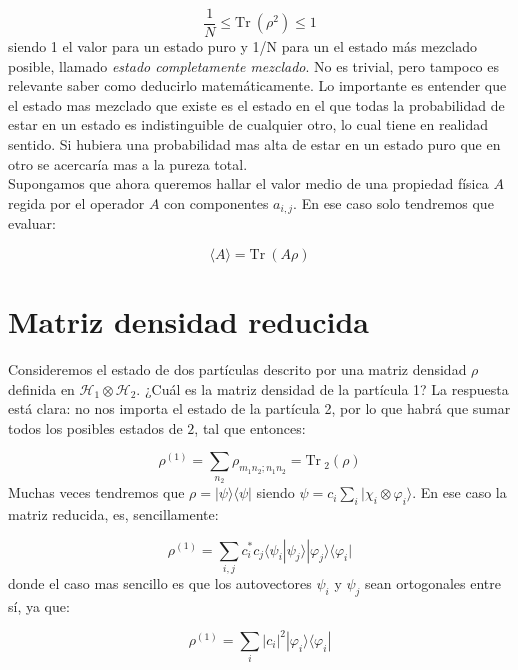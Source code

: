 \documentclass[12pt,a4paper]{book}
\numberwithin{equation}{chapter}
\numberwithin{figure}{chapter}
\newcommand{\Tr}{\mathrm{Tr} \ }
\newcommand{\Hcal}{\mathcal{H}}
\begin{document}
\begin{equation}
\frac{1}{N} \leq \Tr (\rho^2) \leq 1
\end{equation}
siendo 1 el valor para un estado puro y 1/N para un el estado más mezclado posible, llamado \textit{estado completamente mezclado}. No es trivial, pero tampoco es relevante saber como deducirlo matemáticamente. Lo importante es entender que el estado mas mezclado que existe es el estado en el que todas la probabilidad de estar en un estado es indistinguible de cualquier otro, lo cual tiene en realidad sentido. Si hubiera una probabilidad mas alta de estar en un estado puro que en otro se acercaría mas a la pureza total. \\

Supongamos que ahora queremos hallar el valor medio de una propiedad física $A$ regida por el operador $A$ con componentes $a_{i,j}$. En ese caso solo tendremos que evaluar:

\begin{equation}
\langle A \rangle = \Tr (A \rho)
\end{equation}

\section{Matriz densidad reducida}

Consideremos el estado de dos partículas descrito por una matriz densidad $\rho$ definida en $\Hcal_1 \otimes \Hcal_2$. ¿Cuál es la matriz densidad de la partícula 1? La respuesta está clara: no nos importa el estado de la partícula 2, por lo que habrá que sumar todos los posibles estados de $2$, tal que entonces:

\begin{equation}
\rho^{(1)}  = \sum_{n_2} \rho_{m_1 n_2; n_1 n_2}  = \Tr_2 (\rho)
\end{equation}
Muchas veces tendremos que $\rho = |\psi \rangle \langle \psi |$ siendo $\psi = c_i \sum_i |\chi_i \otimes \varphi_i \rangle$. En ese caso la matriz reducida, es, sencillamente:

\begin{equation}
\rho^{(1)} = \sum_{i,j} c_i^* c_j \langle \psi_i | \psi_j \rangle | \varphi_j \rangle \langle \varphi_i |
\end{equation}
donde el caso mas sencillo es que los autovectores $\psi_i$ y $\psi_j$ sean ortogonales entre sí, ya que:

\begin{equation}
\rho^{(1)} = \sum_i |c_i|^2 |\varphi_i \rangle \langle \varphi_i |
\end{equation}
\end{document}
